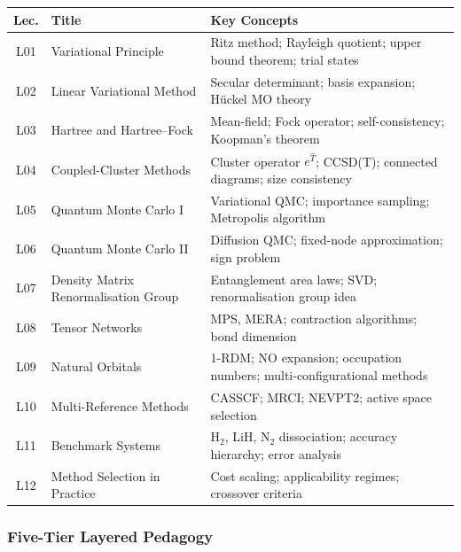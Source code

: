 \documentclass[11pt,a4paper]{article}
\begin{document}
\begin{center}
\begin{tabularx}{\textwidth}{clX}
\toprule
\textbf{Lec.} & \textbf{Title} & \textbf{Key Concepts}\\
\midrule
L01 & Variational Principle & Ritz method; Rayleigh quotient; upper bound theorem; trial states\\
L02 & Linear Variational Method & Secular determinant; basis expansion; H\"uckel MO theory\\
L03 & Hartree and Hartree--Fock & Mean-field; Fock operator; self-consistency; Koopman's theorem\\
L04 & Coupled-Cluster Methods & Cluster operator $e^{\hat{T}}$; CCSD(T); connected diagrams; size consistency\\
L05 & Quantum Monte Carlo I & Variational QMC; importance sampling; Metropolis algorithm\\
L06 & Quantum Monte Carlo II & Diffusion QMC; fixed-node approximation; sign problem\\
L07 & Density Matrix Renormalisation Group & Entanglement area laws; SVD; renormalisation group idea\\
L08 & Tensor Networks & MPS, MERA; contraction algorithms; bond dimension\\
L09 & Natural Orbitals & 1-RDM; NO expansion; occupation numbers; multi-configurational methods\\
L10 & Multi-Reference Methods & CASSCF; MRCI; NEVPT2; active space selection\\
L11 & Benchmark Systems & H$_2$, LiH, N$_2$ dissociation; accuracy hierarchy; error analysis\\
L12 & Method Selection in Practice & Cost scaling; applicability regimes; crossover criteria\\
\bottomrule
\end{tabularx}
\end{center}

\subsubsection*{Five-Tier Layered Pedagogy}
\end{document}
